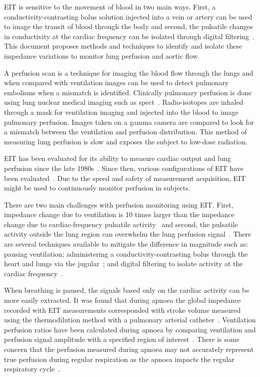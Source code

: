 EIT is sensitive to the movement of blood in two main ways. First, a conductivity-contrasting 
bolus solution injected into a vein or artery can be used to image the transit of blood through the body
and second, the pulsatile changes in conductivity at the cardiac frequency can be isolated 
through digital filtering~\parencite{Leathard1994}.
This document proposes methods and techniques to identify and isolate these impedance variations
to monitor lung perfusion and 
aortic flow.

A perfusion scan is a technique for imaging the blood flow through the lungs
and when compared with ventilation images can be used to detect pulmonary embolisms
when a mismatch is identified. Clinically pulmonary perfusion is done using 
lung nuclear medical imaging such as \acrfull{spect}~\parencite{Parker2012}. Radio-isotopes are inhaled through a mask 
for ventilation imaging and injected into the blood to image pulmonary perfusion. 
Images taken on a gamma camera are compared to look for a mismatch between the ventilation
and perfusion distribution. This method of 
measuring lung perfusion is slow and exposes the subject to low-dose radiation.

EIT has been evaluated for its ability to measure cardiac output and
lung perfusion since the late 1980s~\parencite{Eyuboglu1989,Blottt1992,Brown1992,Frerichs2002}. 
Since then, various configurations of EIT have been evaluated~\parencite{Borges2012,Nguyen2015}.
Due to the speed and safety of measurement acquisition, EIT might be used to continuously monitor 
perfusion in subjects.

There are two main challenges with perfusion monitoring using EIT. First, impedance change due to ventilation 
is 10 times larger than the impedance change due to cardiac-frequency pulsatile activity~\parencite{Deibele2008}
and second, the pulsatile activity outside the lung region can overwhelm the lung perfusion signal~\parencite{Stowe2019}. 
There are several techniques available to mitigate the difference 
in magnitude such as: pausing ventilation; administering a 
conductivity-contrasting bolus through the heart and lungs via the jugular~\parencite{Frerichs2002};
and digital filtering to isolate activity at the cardiac frequency~\parencite{Leathard1994}. 

When breathing is paused, the signals based only on the cardiac activity can be more easily extracted. 
It was found that during apnoea the global impedance recorded with EIT measurements corresponded with stroke volume 
measured using the 
thermodilution method with a pulmonary arterial catheter~\parencite{Fagerberg2009}.
Ventilation perfusion ratios have been calculated during apnoea by comparing 
ventilation and perfusion signal amplitude with a specified region of 
interest~\parencite{Fagerberg2009a}.
There is some concern that the perfusion measured during apnoea may not accurately represent 
true perfusion during regular respiration as the apnoea impacts the regular respiratory cycle~\parencite{Leonhardt2012}.


